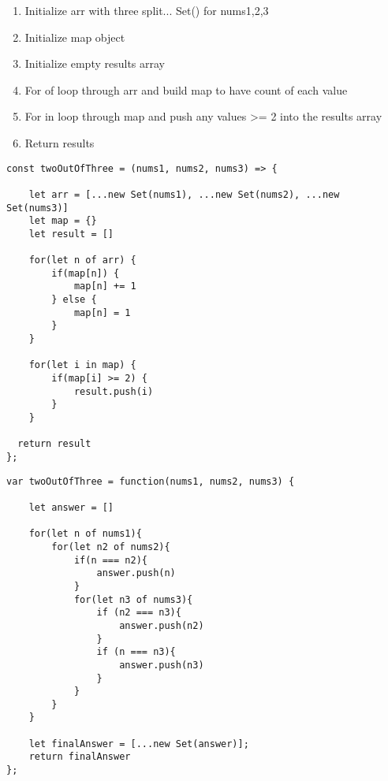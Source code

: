 \documentclass[10pt]{article}
\begin{document}
\begin{enumerate}
	\item Initialize arr with three split... Set() for nums1,2,3
	\item Initialize map object
	\item Initialize empty results array
	\item For of loop through arr and build map to have count of each value
	\item For in loop through map and push any values >= 2 into the results array
	\item Return results
\end{enumerate}

\begin{lstlisting}[title=Solution twoOutOfThree O(n) time/space, captionpos=t]
const twoOutOfThree = (nums1, nums2, nums3) => {
    
    let arr = [...new Set(nums1), ...new Set(nums2), ...new Set(nums3)]
    let map = {}
    let result = []
    
    for(let n of arr) {
        if(map[n]) {
            map[n] += 1
        } else {
            map[n] = 1
        }
    }
    
    for(let i in map) {
        if(map[i] >= 2) {
            result.push(i)
        }
    }
    
  return result  
};
\end{lstlisting}


\begin{lstlisting}[title=Solution twoOutOfThree - clunky first answer, captionpos=t]
var twoOutOfThree = function(nums1, nums2, nums3) {
    
    let answer = []
    
    for(let n of nums1){
        for(let n2 of nums2){
            if(n === n2){
                answer.push(n)
            }
            for(let n3 of nums3){
                if (n2 === n3){
                    answer.push(n2)
                }
                if (n === n3){
                    answer.push(n3)
                }
            }
        }
    }
    
    let finalAnswer = [...new Set(answer)];
    return finalAnswer
};
\end{lstlisting}
\medskip %








\pagebreak %
\medskip   
\end{document}

